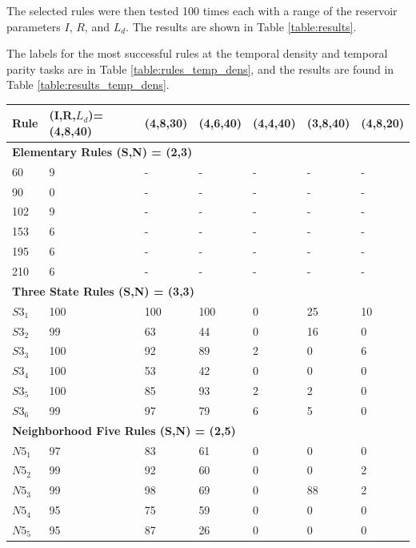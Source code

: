 \documentclass{elsarticle}
\begin{document}
\begin{multicols}{2}
The selected rules were then tested 100 times each with a range of the 
   reservoir parameters $I$, $R$, and $L_{d}$.  The results are shown in Table 
   \ref{table:results}. \par The labels for the most successful rules at the 
   temporal density and temporal parity tasks are in Table 
   \ref{table:rules_temp_dens}, and the results are found in Table 
   \ref{table:results_temp_dens}.



\begin{table}[!htbp] \centering
\small
\begin{tabular}{|l|l|l|l|l|l|l|}
\hline
\textbf{Rule} & \textbf{(I,R,$L_{d}$)=(4,8,40)} & \textbf{(4,8,30)} & 
\textbf{(4,6,40)} & \textbf{(4,4,40)} & \textbf{(3,8,40)} & \textbf{(4,8,20)} 
\\ \hline
\multicolumn{7}{|l|}{\textbf{Elementary Rules (S,N) = (2,3)}} \\ \hline
60 & 9 & - & - & - & - & - \\ \hline
90 & 0 & - & - & - & - & - \\ \hline
102 & 9 & - & - & - & - & - \\ \hline
153 & 6 & - & - & - & - & - \\ \hline
195 & 6 & - & - & - & - & - \\ \hline
210 & 6 & - & - & - & - & - \\ \hline
\multicolumn{7}{|l|}{\textbf{Three State Rules (S,N) = (3,3)}} \\ \hline
$S3_{1}$ & 100 & 100 & 100 & 0 & 25 & 10 \\ \hline
$S3_{2}$ & 99 & 63 & 44 & 0 & 16 & 0 \\ \hline
$S3_{3}$ & 100 & 92 & 89 & 2 & 0 & 6 \\ \hline
$S3_{4}$ & 100 & 53 & 42 & 0 & 0 & 0 \\ \hline
$S3_{5}$ & 100 & 85 & 93 & 2 & 2 & 0 \\ \hline
$S3_{6}$ & 99 & 97 & 79 & 6 & 5 & 0 \\ \hline
\multicolumn{7}{|l|}{\textbf{Neighborhood Five Rules (S,N) = (2,5)}} \\ \hline
$N5_{1}$ & 97 & 83 & 61 & 0 & 0 & 0 \\ \hline
$N5_{2}$ & 99 & 92 & 60 & 0 & 0 & 2 \\ \hline
$N5_{3}$ & 99 & 98 & 69 & 0 & 88 & 2  \\ \hline
$N5_{4}$ & 95 & 75 & 59 & 0 & 0 & 0 \\ \hline
$N5_{5}$ & 95 & 87 & 26 & 0 & 0 & 0 \\ \hline

\end{tabular}
\end{table}
\end{multicols}
\end{document}
